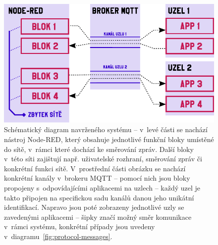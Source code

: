 \begin{figure}
    \centering
    \includegraphics[width=\textwidth]{figures/system-schema.pdf}
    \caption{Schématický diagram navrženého systému -- v~levé části se nachází nástroj Node-RED, který obsahuje
    jednotlivé funkční bloky umístěné do sítě, v~rámci které dochází ke směrování zpráv.
    Další bloky v~této síti zajištují např. uživatelské rozhraní, směrování zpráv či konkrétní funkci sítě.
    V~prostřední části obrázku se nachází konkrétní kanály v~brokeru MQTT -- pomocí nich jsou bloky propojeny
s~odpovídajícími aplikacemi na uzlech -- každý uzel je takto připojen na specifickou sadu kanálů danou jeho
    unikátní identifikací.
    Napravo jsou poté zobrazeny jednotlivé uzly se zavedenými aplikacemi -- šipky značí možný směr komunikace v~rámci
    systému, konkrétní případy jsou uvedeny v~diagramu~\ref{fig:protocol-messages}.
    }
    \label{fig:system-schema}
\end{figure}

